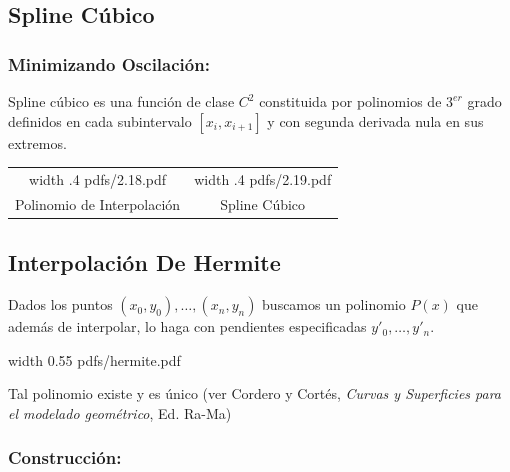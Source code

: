 \documentclass[twoside]{report}
\newcommand{\celeste}[1]{\textcolor{cyan}{#1}}
\newcommand{\colocapdf}[2]{\quad\pdfimage width #2 {pdfs/#1.pdf}}
\begin{document}
\subsection{Spline Cúbico}

\subsubsection{Minimizando Oscilación:}

\begin{defi}
Spline c\'{u}bico es una funci\'{o}n de clase $C^2$ constituida por polinomios de $3^{er}$ grado definidos en cada subintervalo $[x_i,x_{i+1}]$ y con segunda derivada nula en sus extremos.
\end{defi}

\begin{center}
\begin{tabular}{cc}
\colocapdf{2.18}{.4\textwidth} & \colocapdf{2.19}{.4\textwidth}
\\ Polinomio de Interpolaci\'{o}n &  Spline C\'{u}bico
\end{tabular}
\end{center}


\subsection{Interpolación De Hermite}

Dados los puntos $(x_0,y_0),\ldots,(x_n,y_n)$ buscamos un polinomio $P(x)$ que adem\'{a}s de interpolar, lo haga con pendientes especificadas $y'_0,\ldots,y'_n$.

\begin{center}
\colocapdf{hermite}{0.55\textwidth}
\end{center}

Tal polinomio existe y es \'{u}nico (ver Cordero y Cort\'{e}s, {\it Curvas y Superficies para el modelado geom\'{e}trico}, Ed. Ra-Ma)

\subsubsection{Construcción:}
\end{document}
